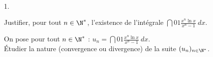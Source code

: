 \documentclass[11pt]{article}%
\begin{document}

\begin{exerciceSP}~
  \begin{noliste}{1.}
    \setlength{\itemsep}{2mm}
  \item Justifier, pour tout $n \in \N^*$, l'existence de l'intégrale
    $\dint{0}{1} \frac{ x^n \ln x }{ x^n - 1 } \ dx$.
  \item On pose pour tout $n \in \N^*$ : $u_n = \dint{0}{1} \frac{ x^n
      \ln x }{ x^n - 1 } \ dx$.\\
    Étudier la nature (convergence ou divergence) de la suite $(u_n)_{
      n \in \N^* }$.
  \end{noliste}
\end{exerciceSP}




\end{document}
